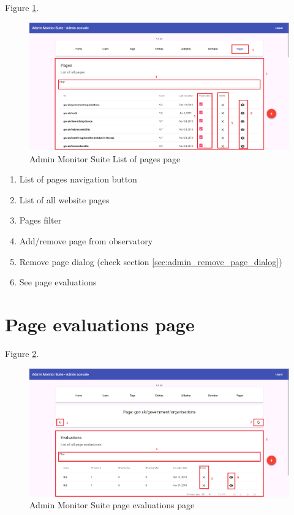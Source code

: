 Figure \ref{fig:admin_list_pages_page}.

\begin{figure}[H]
    \centering
    \includegraphics[width=\linewidth]{lib/images/admin/admin_list_pages_page.png}
    \caption{Admin Monitor Suite List of pages page}
    \label{fig:admin_list_pages_page}
\end{figure}

\begin{enumerate}
    \item List of pages navigation button
    \item List of all website pages
    \item Pages filter
    \item Add/remove page from observatory
    \item Remove page dialog (check section \ref{sec:admin_remove_page_dialog})
    \item See page evaluations
\end{enumerate}

\clearpage

\section{Page evaluations page}

Figure \ref{fig:admin_page_evaluations_page}.

\begin{figure}[H]
    \centering
    \includegraphics[width=\linewidth]{lib/images/admin/admin_page_evaluations_page.png}
    \caption{Admin Monitor Suite page evaluations page}
    \label{fig:admin_page_evaluations_page}
\end{figure}

